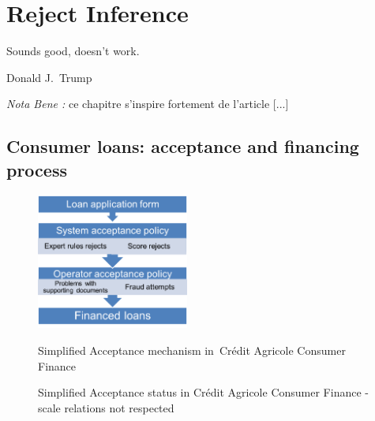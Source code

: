 
\chapter{Reject Inference} \label{chap2}

\epigraph{Sounds good, doesn't work.}{Donald J.\ Trump}

\minitoc

\textit{Nota Bene :} ce chapitre s'inspire fortement de l'article [...]

\bigskip




\section{Consumer loans: acceptance and financing process}



\begin{figure}[ht]
\begin{minipage}[b]{0.45\linewidth}
\center \includegraphics[width=5cm]{figures/chapitre2/schema.png}
\caption{Simplified Acceptance mechanism in~Crédit Agricole Consumer Finance}
\label{fig:figure1}

\end{minipage}%
\hfil \begin{minipage}[b]{0.5\linewidth}

\center {}
\caption{Simplified Acceptance status in Crédit Agricole Consumer Finance - scale relations not respected}
\label{fig:figure2}

\end{minipage}
\end{figure}




